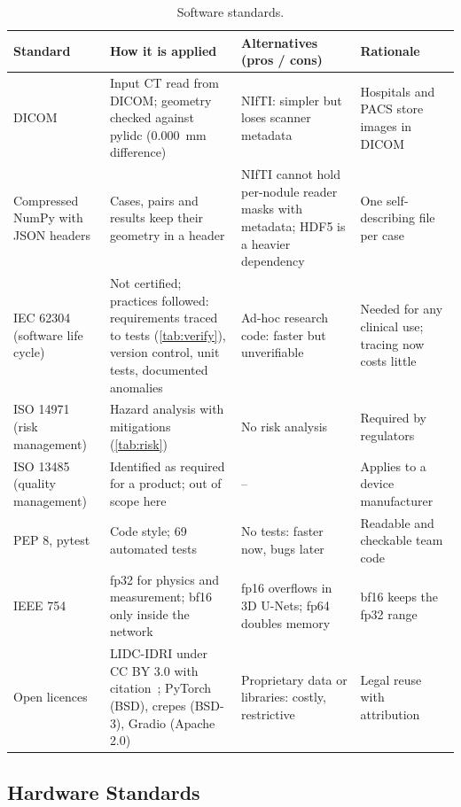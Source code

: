 \begin{table}[!htbp]
\centering\small
\caption{Software standards.}
\label{tab:swstd}
\begin{tabularx}{\linewidth}{>{\raggedright\arraybackslash}p{2.9cm} >{\raggedright\arraybackslash}X >{\raggedright\arraybackslash}X >{\raggedright\arraybackslash}X}
\toprule
Standard & How it is applied & Alternatives (pros / cons) & Rationale \\
\midrule
DICOM~\cite{dicom} & Input CT read from DICOM; geometry checked against pylidc (0.000~mm difference) & NIfTI: simpler but loses scanner metadata & Hospitals and PACS store images in DICOM \\
Compressed NumPy with JSON headers & Cases, pairs and results keep their geometry in a header & NIfTI cannot hold per-nodule reader masks with metadata; HDF5 is a heavier dependency & One self-describing file per case \\
IEC 62304~\cite{iec62304} (software life cycle) & Not certified; practices followed: requirements traced to tests (\cref{tab:verify}), version control, unit tests, documented anomalies & Ad-hoc research code: faster but unverifiable & Needed for any clinical use; tracing now costs little \\
ISO 14971~\cite{iso14971} (risk management) & Hazard analysis with mitigations (\cref{tab:risk}) & No risk analysis & Required by regulators \\
ISO 13485~\cite{iso13485} (quality management) & Identified as required for a product; out of scope here & -- & Applies to a device manufacturer \\
PEP 8, pytest & Code style; 69 automated tests & No tests: faster now, bugs later & Readable and checkable team code \\
IEEE 754 & fp32 for physics and measurement; bf16 only inside the network & fp16 overflows in 3D U-Nets; fp64 doubles memory & bf16 keeps the fp32 range \\
Open licences & LIDC-IDRI under CC BY 3.0 with citation~\cite{tcia_policy}; PyTorch (BSD), crepes (BSD-3), Gradio (Apache 2.0) & Proprietary data or libraries: costly, restrictive & Legal reuse with attribution \\
\bottomrule
\end{tabularx}
\end{table}

\subsection{Hardware Standards}

